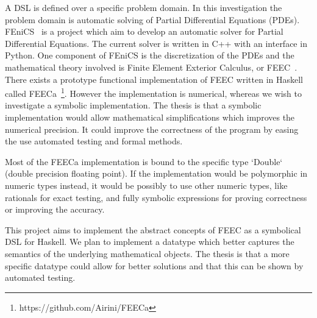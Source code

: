 \documentclass{scrartcl}
\begin{document}
A DSL is defined over a specific problem domain. In this investigation the
problem domain is automatic solving of Partial Differential Equations (PDEs).
FEniCS~\cite{AlnaesBlechta2015a} is a project which aim to develop an automatic
solver for Partial Differential Equations.  The current solver is written in
C++ with an interface in Python. One component of FEniCS is the discretization
of the PDEs and the mathematical theory involved is Finite Element Exterior
Calculus, or FEEC~\cite{arnold2006finite}.  There exists a prototype functional
implementation of FEEC written in Haskell called
FEECa~\footnote{https://github.com/Airini/FEECa}.
However the implementation is numerical, whereas we wish to investigate
a symbolic implementation.
The thesis is that a symbolic implementation would allow mathematical
simplifications which improves the numerical precision. It could improve the
correctness of the program by easing the use automated testing and formal
methods.


Most of the FEECa implementation is bound to the specific type `Double` (double
precision floating point).  If the implementation would be polymorphic in
numeric types instead, it would be possibly to use other numeric types, like
rationals for exact testing, and fully symbolic expressions for proving
correctness or improving the accuracy.


This project aims to implement the abstract concepts of FEEC as a symbolical
DSL for Haskell.  %
We plan to implement a datatype which better captures the semantics of the
underlying mathematical objects.  The thesis is that a more specific datatype
could allow for better solutions and that this can be shown by automated
testing.


\end{document}
